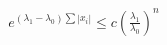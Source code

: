 \documentclass[preview]{standalone}
\begin{document}
\begin{align*}
e^{(\lambda_1-\lambda_0)\sum |x_i|} \leq c \left(\frac{\lambda_1}{\lambda_0}\right)^n
\end{align*}
\end{document}
